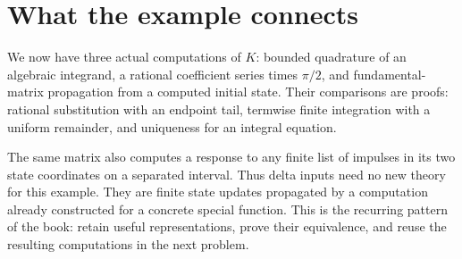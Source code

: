 \section{What the example connects}
We now have three actual computations of $K$: bounded quadrature of an
algebraic integrand, a rational coefficient series times $\pi/2$, and
fundamental-matrix propagation from a computed initial state.  Their
comparisons are proofs: rational substitution with an endpoint tail,
termwise finite integration with a uniform remainder, and uniqueness for
an integral equation.

The same matrix also computes a response to any finite list of impulses
in its two state coordinates on a separated interval.  Thus delta inputs
need no new theory for this example.  They are finite state updates
propagated by a computation already constructed for a concrete special
function.  This is the recurring pattern of the book: retain useful
representations, prove their equivalence, and reuse the resulting
computations in the next problem.
